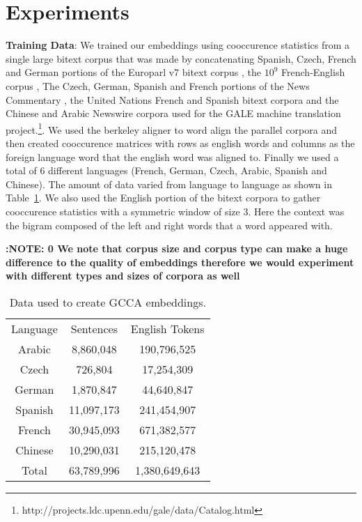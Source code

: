 \documentclass[11pt]{article}
\begin{document}
\section{Experiments}
\textbf{Training Data}: We trained our embeddings using cooccurence
statistics from a single large bitext corpus that was made by
concatenating Spanish, Czech, French and German portions of the
Europarl v7 bitext corpus \cite{koehn2005europarl}, the $10^9$
French-English corpus \cite{callisonburch2009findings}, The Czech,
German, Spanish and French portions of the News Commentary
\cite{koehn2007experiments}, the United Nations French and Spanish
bitext corpora \cite{eisele2010multiun} and the Chinese and Arabic
Newswire corpora used for the GALE machine translation
project.\footnote{{http://projects.ldc.upenn.edu/gale/data/Catalog.html}}. We
used the berkeley aligner to word align the parallel corpora and then
created cooccurence matrices with rows as english words and columns as
the foreign language word that the english word was aligned
to. Finally we used a total of 6 different languages (French, German,
Czech, Arabic, Spanish and Chinese). The amount of data varied from
language to language as shown in Table~\ref{tab:dataperlang}. We also
used the English portion of the bitext corpora to gather cooccurence
statistics with a symmetric window of size 3. Here the context was the
bigram composed of the left and right words that a word
appeared with.

\textbf{:NOTE: 0 We note that corpus size and corpus type can make a huge
  difference to the quality of embeddings therefore we would
  experiment with different types and sizes of corpora as well}

\begin{table}[htbp]
  \centering
  \begin{tabular}{ccc}
    Language & Sentences & English Tokens \\
    Arabic   & 8,860,048   & 190,796,525  \\
    Czech    & 726,804     & 17,254,309   \\
    German   & 1,870,847   & 44,640,847   \\
    Spanish  & 11,097,173  & 241,454,907  \\
    French   & 30,945,093  & 671,382,577  \\
    Chinese  & 10,290,031  & 215,120,478  \\
    Total    & 63,789,996  & 1,380,649,643  \\
  \end{tabular}  
  \caption{Data used to create GCCA embeddings.}
  \label{tab:dataperlang}
\end{table}
\end{document}
